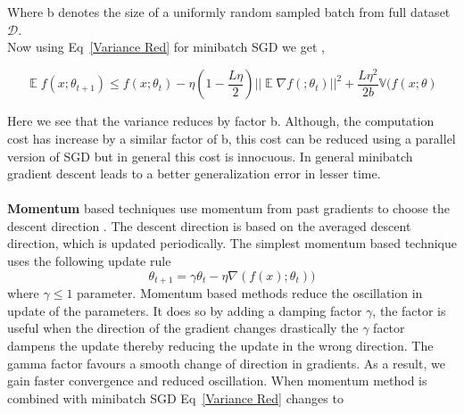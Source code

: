 \documentclass[a4paper,twoside]{iiththesis}
\theoremstyle{definition}
\theoremstyle{definition}
\theoremstyle{remark}
\DeclareMathOperator*{\E}{\mathop{\mathbb{E}}}
\begin{document}
Where b denotes the size of a uniformly random sampled batch from full dataset $\mathcal{D}$. \\
Now using Eq~\ref{Variance Red} for minibatch SGD we get , 

\begin{equation}
\E f(x; \theta_{t+1}) \leq  f(x; \theta_t) - \eta(1 -\frac{L\eta}{2}) ||\E \nabla f(; \theta_{t})||^2 + \frac{L\eta^2}{2 b}  \mathbb{V}(f(x ;\theta) 
\end{equation}

Here we see that the variance reduces by factor b. Although, the computation cost has increase by a similar factor of b, this cost can be reduced using a parallel version of SGD but in general this cost is innocuous. In general minibatch gradient descent leads to a better generalization error in lesser time.
\\
\\
\textbf{Momentum} based techniques use momentum from past gradients to choose the descent direction\cite{johnson2013accelerating} \cite{schmidt2013minimizing}. The descent direction is based on the averaged descent direction, which is updated periodically. 
The simplest momentum based technique uses the following update rule 
\begin{equation}
\theta_{t+1} = \gamma \theta_{t} - \eta \nabla(f(x); \theta_t)) 
\end{equation}
where $\gamma \leq 1$ parameter. Momentum based methods reduce the oscillation in update of the parameters. It does so by adding a damping factor $\gamma$, the factor is useful when the direction of the gradient changes drastically the $\gamma$ factor dampens the update thereby reducing the update in the wrong direction. The gamma factor favours a smooth change of direction in gradients. As a result, we gain faster convergence and reduced oscillation. When momentum method is combined with minibatch SGD Eq~\ref{Variance Red} changes to 
\end{document}
